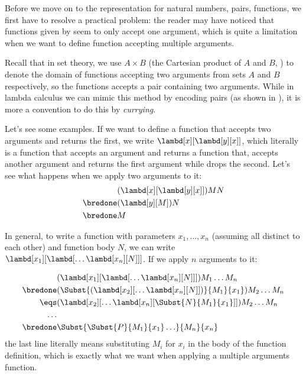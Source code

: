 \documentclass[../../../include/open-logic-section]{subfiles}
\begin{document}

Before we move on to the representation for natural numbers, pairs,
functions, we first have to resolve a practical problem:
the reader may have noticed that functions given by  seem to only accept one argument, which
is quite a limitation when we want to define function accepting multiple
arguments.

Recall that in set theory, we use $A \times B$ (the Cartesian product
of $A$ and $B$, \olref[sfr][set][pai]) to denote the domain of functions accepting two
arguments from sets $A$ and $B$ respectively, so the functions accepts
a pair containing two arguments. While in lambda calculus we can mimic
this method by encoding pairs (as shown in ),
it is more a convention to do this by \emph{currying}.

Let's see some examples. If we want to define a function that accepts
two arguments and returns the first, we write
$\lambd[x][\lambd[y][x]]$, which literally is a function that accepts
an argument and returns a function that, accepts another argument and 
returns the first argument while drops the second. Let's see what
happens when we apply two arguments to it:
\begin{align*}
  &(\lambd[x][\lambd[y][x]])MN \\
  \bredone&(\lambd[y][M])N \\
  \bredone&M
\end{align*}

In general, to write a function with parameters $x_1, \ldots, x_n$
(assuming all distinct to each other)
and function body $N$, we can write
$\lambd[x_1][\lambd[\ldots\lambd[x_n][N]]]$. If we apply $n$ arguments
to it:

\begin{align*}
  &(\lambd[x_1][\lambd[\ldots\lambd[x_n][N]]]) M_1 \dots M_n \\
  \bredone&(\Subst{(\lambd[x_2][\ldots\lambd[x_n][N]])}{M_1}{x_1}) M_2
  \dots M_n\\
  \eqs&(\lambd[x_2][\ldots\lambd[x_n][\Subst{N}{M_1}{x_1}]]) M_2
            \dots M_n \\
  \ldots \\
  \bredone&\Subst{\Subst{P}{M_1}{x_1}\ldots}{M_n}{x_n}
\end{align*}
the last line literally means substituting $M_i$ for $x_i$ in the body
of the function definition, which is exactly what we want when
applying a multiple arguments function.
\end{document}
